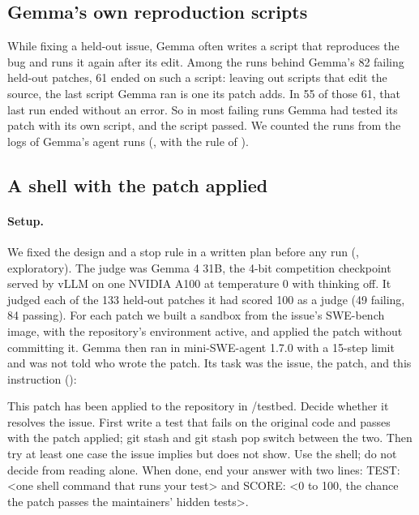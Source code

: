 \documentclass[10pt,letterpaper]{article}
\begin{document}
\subsection*{Gemma's own reproduction scripts}

While fixing a held-out issue, Gemma often writes a script that reproduces the bug and runs it again after its edit.
Among the runs behind Gemma's 82 failing held-out patches, 61 ended on such a script: leaving out scripts that edit the
source, the last script Gemma ran is one its patch adds. In 55 of those 61, that last run ended without an error. So in
most failing runs Gemma had tested its patch with its own script, and the script passed. We counted the runs from the
logs of Gemma's agent runs (, with the rule of ).

\subsection*{A shell with the patch applied}

\paragraph{Setup.} We fixed the design and a stop rule in a written plan before any run (,
exploratory). The judge was Gemma 4 31B, the 4-bit competition checkpoint served by vLLM on one NVIDIA
A100 at temperature 0 with thinking off. It judged each of the 133 held-out patches it had scored 100 as a judge
(49 failing, 84 passing). For each
patch we built a sandbox from the issue's SWE-bench image, with the repository's environment active, and applied the
patch without committing it. Gemma then ran in mini-SWE-agent 1.7.0 with a 15-step limit and was not told who wrote
the patch. Its task was the issue, the patch, and this instruction ():

\begin{promptbox}\ttfamily
This patch has been applied to the repository in /testbed. Decide whether it resolves the issue. First write a test
that fails on the original code and passes with the patch applied; git stash and git stash pop switch between the two.
Then try at least one case the issue implies but does not show. Use the shell; do not decide from reading alone. When
done, end your answer with two lines: TEST: <one shell command that runs your test> and SCORE: <0 to 100, the chance
the patch passes the maintainers' hidden tests>.
\end{promptbox}
\end{document}
